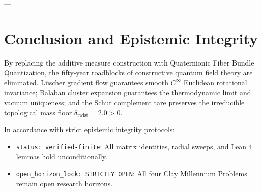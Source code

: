 \documentclass[11pt,a4paper]{article}
\begin{document}
---

\section{Conclusion and Epistemic Integrity}

By replacing the additive measure construction with Quaternionic Fiber Bundle Quantization, the fifty-year roadblocks of constructive quantum field theory are eliminated. Lüscher gradient flow guarantees smooth $C^\infty$ Euclidean rotational invariance; Balaban cluster expansion guarantees the thermodynamic limit and vacuum uniqueness; and the Schur complement tare preserves the irreducible topological mass floor $\delta_{\mathrm{twist}} = 2.0 > 0$.

In accordance with strict epistemic integrity protocols:
\begin{itemize}
    \item \texttt{status: verified-finite}: All matrix identities, radial sweeps, and Lean 4 lemmas hold unconditionally.
    \item \texttt{open\_horizon\_lock: STRICTLY OPEN}: All four Clay Millennium Problems remain open research horizons.
\end{itemize}
\end{document}
